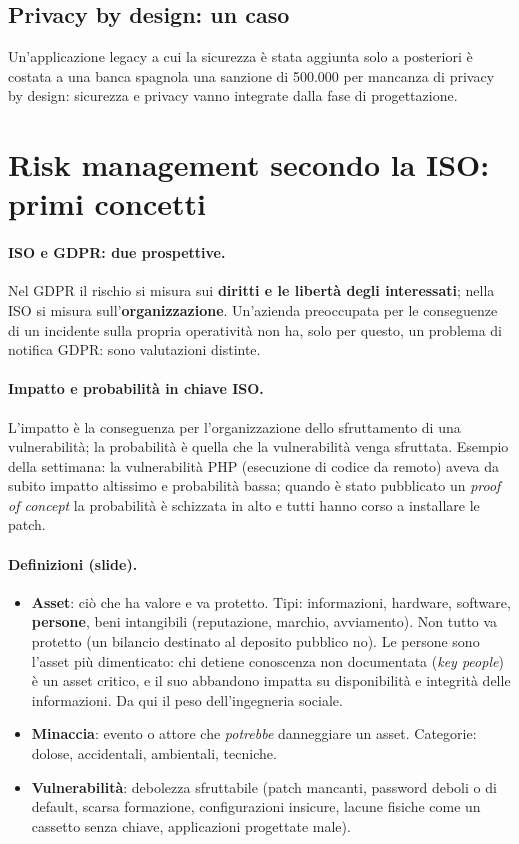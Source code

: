 \subsection{Privacy by design: un caso}
Un'applicazione legacy a cui la sicurezza è stata aggiunta solo a posteriori è costata a una banca
spagnola una sanzione di \texteuro{}500.000 per mancanza di privacy by design: sicurezza e privacy vanno
integrate dalla fase di progettazione.

\section{Risk management secondo la ISO: primi concetti}

\paragraph{ISO e GDPR: due prospettive.} Nel GDPR il rischio si misura sui \textbf{diritti e le libertà
degli interessati}; nella ISO si misura sull'\textbf{organizzazione}. Un'azienda preoccupata per le
conseguenze di un incidente sulla propria operatività non ha, solo per questo, un problema di notifica
GDPR: sono valutazioni distinte.

\paragraph{Impatto e probabilità in chiave ISO.} L'impatto è la conseguenza per l'organizzazione dello
sfruttamento di una vulnerabilità; la probabilità è quella che la vulnerabilità venga sfruttata.
Esempio della settimana: la vulnerabilità PHP (esecuzione di codice da remoto) aveva da subito impatto
altissimo e probabilità bassa; quando è stato pubblicato un \emph{proof of concept} la probabilità è
schizzata in alto e tutti hanno corso a installare le patch.

\paragraph{Definizioni (slide).}
\begin{itemize}
  \item \textbf{Asset}: ciò che ha valore e va protetto. Tipi: informazioni, hardware, software,
    \textbf{persone}, beni intangibili (reputazione, marchio, avviamento). Non tutto va protetto (un
    bilancio destinato al deposito pubblico no). Le persone sono l'asset più dimenticato: chi detiene
    conoscenza non documentata (\emph{key people}) è un asset critico, e il suo abbandono impatta su
    disponibilità e integrità delle informazioni. Da qui il peso dell'ingegneria sociale.
  \item \textbf{Minaccia}: evento o attore che \emph{potrebbe} danneggiare un asset. Categorie: dolose,
    accidentali, ambientali, tecniche.
  \item \textbf{Vulnerabilità}: debolezza sfruttabile (patch mancanti, password deboli o di default,
    scarsa formazione, configurazioni insicure, lacune fisiche come un cassetto senza chiave, applicazioni
    progettate male).
\end{itemize}

